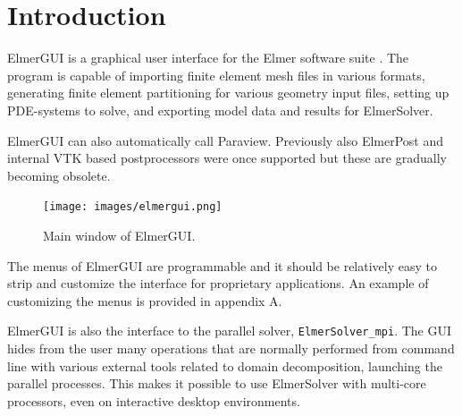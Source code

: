 

\chapter{Introduction}

ElmerGUI is a graphical user interface for the Elmer software suite
\cite{ElmerHome}. The program is capable of importing finite element mesh files in
various formats, generating finite element partitioning for various geometry
input files, setting up PDE-systems to solve, and exporting model data and results
for ElmerSolver.

ElmerGUI can also automatically call Paraview. Previously also ElmerPost and internal
VTK based postprocessors were once supported but these are gradually becoming obsolete.

\begin{figure}[htb]
\begin{center}
 \texttt{[image: images/elmergui.png]}
\caption{Main window of ElmerGUI.}
\end{center}
\end{figure}

The menus of ElmerGUI are programmable and it should be relatively easy to strip and customize the interface
for proprietary applications. An example of customizing the menus is provided in appendix A.

ElmerGUI is also the interface to the parallel solver,  {\tt ElmerSolver\_mpi}.
The GUI hides from the user many operations that are normally performed from command line with
various external tools related to domain decomposition, launching the parallel processes.
This makes it possible to use ElmerSolver with multi-core processors, even on interactive
desktop environments.

